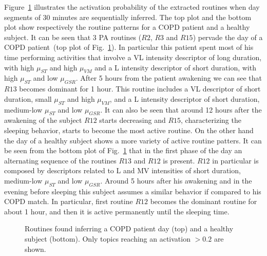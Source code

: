 Figure~\ref{fig:12} illustrates the activation probability of the extracted routines when day segments of 30 minutes are sequentially inferred. The top plot and the bottom plot show respectively the routine patterns for a COPD patient and a healthy subject. It can be seen that 3 PA routines ($R2$, $R3$ and $R15$) pervade the day of a COPD patient~(top plot of Fig.~\ref{fig:12}). In particular this patient spent most of his time performing activities that involve a VL intensity descriptor of long duration, with high $\mu_{ST}$ and high $\mu_{VM}$ and a L intensity descriptor of short duration, with high $\mu_{ST}$ and low $\mu_{GSR}$. After 5 hours from the patient awakening we can see that $R13$ becomes dominant for 1 hour. This routine includes a VL descriptor of short duration, small $\mu_{ST}$ and high $\mu_{VM}$, and a L intensity descriptor of short duration, medium-low $\mu_{ST}$ and low $\mu_{GSR}$. It can also be seen that around 12 hours after the awakening of the subject $R12$ starts decreasing and $R15$, characterizing the sleeping behavior, starts to become the most active routine. On the other hand the day of a healthy subject shows a more variety of active routine patters. It can be seen from the bottom plot of Fig.~\ref{fig:12} that in the first phase of the day an alternating sequence of the routines $R13$ and $R12$ is present. $R12$ in particular is composed by descriptors related to L and MV intensities of short duration, medium-low $\mu_{ST}$ and low $\mu_{GSR}$. Around 5 hours after his awakening and in the evening before sleeping this subject assumes a similar behavior if compared to his COPD match. In particular, first routine $R12$ becomes the dominant routine for about 1 hour, and then it is active permanently until the sleeping time.
%
%
%
%
\begin{figure}[ht]
  \centering
  \mbox{}
  \mbox{}
  \caption{Routines found inferring a COPD patient day (top) and a healthy subject (bottom). Only topics reaching an activation $>0.2$ are shown.}\label{fig:12}
\end{figure}
